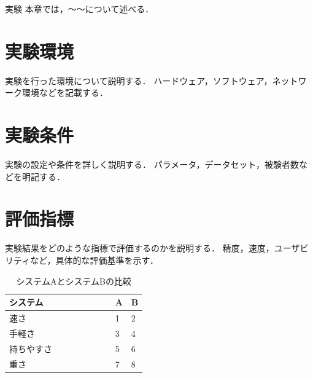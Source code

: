 \chapterhead
{実験}
{本章では，〜〜について述べる．}


\section{実験環境}
実験を行った環境について説明する．
ハードウェア，ソフトウェア，ネットワーク環境などを記載する．

\section{実験条件}
実験の設定や条件を詳しく説明する．
パラメータ，データセット，被験者数などを明記する．


\section{評価指標}
実験結果をどのような指標で評価するのかを説明する．
精度，速度，ユーザビリティなど，具体的な評価基準を示す．

\begin{table}[h]
  \begin{center}
    \caption{システムAとシステムBの比較}
    \begin{tabular}{|l|l|l|} \hline
         システム　　 & A & B \\ \hline
         速さ 　　　　　　　　　& 1 & 2 \\ \hline
         手軽さ 　　　　　　& 3 & 4 \\ \hline
         持ちやすさ & 5 & 6 \\ \hline
         重さ　　　　　　　　　 & 7 & 8 \\ \hline
    \end{tabular}
    \label{tb:angle}
  \end{center}
\end{table}


\newpage


